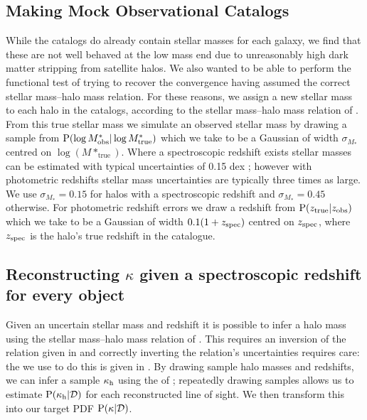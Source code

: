 \documentclass[useAMS,usenatbib]{mn2e}
\begin{document}
\subsection{Making Mock Observational Catalogs}

While the \MS catalogs do already contain stellar masses for each galaxy, we
find that these are not well behaved at the low mass end due to unreasonably high dark matter stripping from satellite halos. We also wanted to be able to perform the functional test of
trying to recover the convergence having assumed the correct stellar
mass--halo mass relation. For these reasons, we assign a new stellar mass to
each halo in the \MS catalogs, according to the stellar mass--halo mass
relation of \citet{BehrooziEtal2010}. From this true  stellar mass we
simulate an observed stellar mass by drawing a sample from 
${\rm P}(\log{M^{*}_{\rm obs}}|\log{M^{*}_{\rm true}})$ which we take to be a
Gaussian of width $\sigma_{M_*}$ centred on $\log(M*_{\mathrm {true}})$. Where
a spectroscopic redshift exists stellar masses can be estimated with typical
uncertainties of 0.15 dex \citep{AugerEtal2009}; however with photometric
redshifts stellar mass uncertainties are typically three times as large. We
use $\sigma_{M_*}=0.15$ for halos with a spectroscopic redshift and
$\sigma_{M_*}=0.45$ otherwise. For photometric redshift errors we draw a
redshift from ${\rm P}(z_{\rm true}|z_{\rm obs})$ which we take to be a Gaussian
of width $0.1(1+z_{\rm spec})$ centred on $z_{\rm spec}$, where $z_{\rm spec}$
is the halo's true redshift in the \MS catalogue.


\subsection{Reconstructing $\kappa$ given a spectroscopic redshift for every object}

Given an uncertain stellar mass and redshift it is possible to infer a
halo mass using the stellar mass--halo mass relation of
\citet{BehrooziEtal2010}. This \proceedure requires an inversion of the
relation given in \citet{BehrooziEtal2010} and correctly inverting the
relation's uncertainties requires care: the \proceedure we use to do this
is given in . By drawing sample halo masses
and redshifts, we can infer a sample $\kappa_{\rm h}$ using the \proceedure of
; repeatedly drawing samples allows us to
estimate ${\rm P}(\kappa_{\rm h}|{\mathcal{D}})$ for each reconstructed line of sight. We then
transform this into our target PDF ${\rm P}(\kappa|{\mathcal{D}})$.
\end{document}
